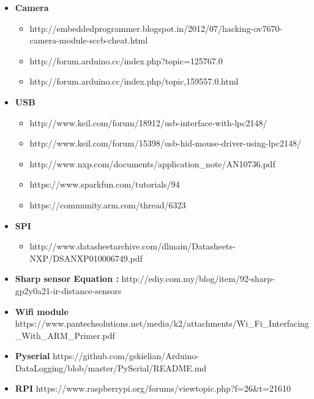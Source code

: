 \documentclass[11pt,a4paper]{book}
\begin{document}
\begin{itemize}
		\item \textbf{Camera}
		\begin{itemize}
			\item	http://embeddedprogrammer.blogspot.in/2012/07/hacking-ov7670-camera-module-sccb-cheat.html
			\item http://forum.arduino.cc/index.php?topic=125767.0
			\item	http://forum.arduino.cc/index.php/topic,159557.0.html 
		\end{itemize}
		
		\item \textbf{USB}
		\begin{itemize}
			\item	http://www.keil.com/forum/18912/usb-interface-with-lpc2148/
			\item	http://www.keil.com/forum/15398/usb-hid-mouse-driver-using-lpc2148/
			\item	http://www.nxp.com/documents/application\_note/AN10736.pdf
			\item	https://www.sparkfun.com/tutorials/94
			\item	https://community.arm.com/thread/6323
			
		\end{itemize}
		
		\item \textbf{SPI}
		\begin{itemize}
			\item http://www.datasheetarchive.com/dlmain/Datasheets-NXP/DSANXP010006749.pdf
			
		\end{itemize}
		
		
		
		\item \textbf{Sharp sensor Equation :}
		http://ediy.com.my/blog/item/92-sharp-gp2y0a21-ir-distance-sensors
		
		\item \textbf{Wifi module}
		https://www.pantechsolutions.net/media/k2/attachments/Wi\_Fi\_Interfacing\_With\_ARM\_Primer.pdf
		
		\item \textbf{Pyserial}
		https://github.com/gskielian/Arduino-DataLogging/blob/master/PySerial/README.md
		
		\item \textbf{RPI}
		https://www.raspberrypi.org/forums/viewtopic.php?f=26\&t=21610
		
	\end{itemize}
	
	
\end{document}
